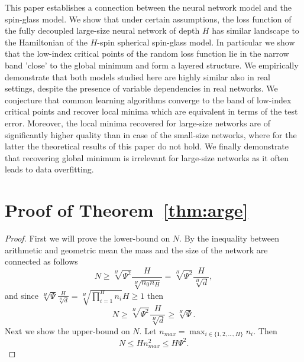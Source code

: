 \documentclass[twoside]{article}
\begin{document}
This paper establishes a connection between the neural network model and the spin-glass model. We show that under certain assumptions, the loss function of the fully decoupled large-size neural network of depth $H$ has similar landscape to the Hamiltonian of the $H$-spin spherical spin-glass model. In particular we show that the low-index critical points of the random loss function lie in the narrow band 'close' to the global minimum and form a layered structure. We empirically demonstrate that both models studied here are highly similar also in real settings, despite the presence of variable dependencies in real networks. We conjecture that common learning algorithms converge to the band of low-index critical points and recover local minima which are equivalent in terms of the test error. Moreover, the local minima recovered for large-size networks are of significantly higher quality than in case of the small-size networks, where for the latter the theoretical results of this paper do not hold. We finally demonstrate that recovering global minimum is irrelevant for large-size networks as it often leads to data overfitting. 






\clearpage

\toptitlebar 
{\Large \bf  {} \par}
\bottomtitlebar

\section{Proof of Theorem~\ref{thm:arge}}
\begin{proof}
First we will prove the lower-bound on $N$. By the inequality between arithmetic and geometric mean the mass and the size of the network are connected as follows
\[N \geq \sqrt[H]{\Psi^2}\frac{H}{\sqrt[H]{n_0n_H}} = \sqrt[H]{\Psi^2}\frac{H}{\sqrt[H]{d}},
\]
and since $\sqrt[H]{\Psi}\frac{H}{\sqrt[H]{d}} = \sqrt[H]{\prod_{i = 1}^{H}n_i}H \geq 1$ then 
\[N \geq \sqrt[H]{\Psi^2}\frac{H}{\sqrt[H]{d}} \geq \sqrt[H]{\Psi}.
\]
Next we show the upper-bound on $N$. Let $n_{max} = \max_{i \in \{1,2,\dots,H\}}n_i$. Then
\[N \leq Hn_{max}^2 \leq H\Psi^2.
\]
\end{proof}
\end{document}
